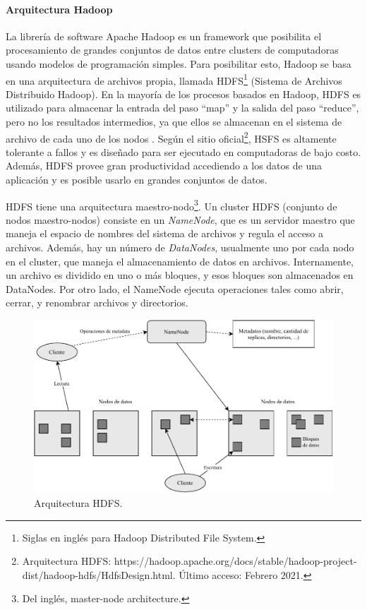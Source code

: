 \paragraph{Arquitectura Hadoop}
La librería de software Apache Hadoop es un framework que posibilita el procesamiento de grandes conjuntos de datos entre clusters de computadoras usando modelos de programación simples. Para posibilitar esto, Hadoop se basa en una arquitectura de archivos propia, llamada HDFS\footnote{Siglas en inglés para Hadoop Distributed File System.} (Sistema de Archivos Distribuido Hadoop). En la mayoría de los procesos basados en Hadoop, HDFS es utilizado para almacenar la entrada del paso ``map'' y la salida del paso ``reduce'', pero no los resultados intermedios, ya que ellos se almacenan en el sistema de archivo de cada uno de los nodos \citep{condie2010mapreduce}. Según el sitio oficial\footnote{Arquitectura HDFS: https://hadoop.apache.org/docs/stable/hadoop-project-dist/hadoop-hdfs/HdfsDesign.html. Último acceso: Febrero 2021.}, HSFS es altamente tolerante a fallos y es diseñado para ser ejecutado en computadoras de bajo costo. Además, HDFS provee gran productividad accediendo a los datos de una aplicación y es posible usarlo en grandes conjuntos de datos.

\bigskip HDFS tiene una arquitectura maestro-nodo\footnote{Del inglés, master-node architecture.}. Un cluster HDFS (conjunto de nodos maestro-nodos) consiste en un \textit{NameNode}, que es un servidor maestro que maneja el espacio de nombres del sistema de archivos y regula el acceso a archivos. Además, hay un número de \textit{DataNodes}, usualmente uno por cada nodo en el cluster, que maneja el almacenamiento de datos en archivos. Internamente, un archivo es dividido en uno o más bloques, y esos bloques son almacenados en DataNodes. Por otro lado, el NameNode ejecuta operaciones tales como abrir, cerrar, y renombrar archivos y directorios.
\bigskip
\begin{figure}[h!]
	\centering
	\includegraphics[width=0.9\linewidth]{7_marco_teorico/imagenes/arquitectura_hdfs}
	\caption{Arquitectura HDFS.}
	\label{fig:arquitectura_hdfs}
\end{figure}

